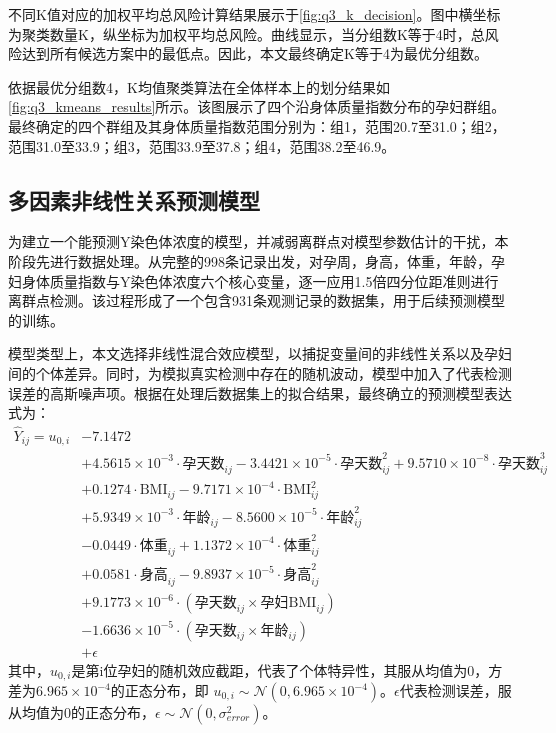 不同K值对应的加权平均总风险计算结果展示于\cref{fig:q3_k_decision}。图中横坐标为聚类数量K，纵坐标为加权平均总风险。曲线显示，当分组数K等于4时，总风险达到所有候选方案中的最低点。因此，本文最终确定K等于4为最优分组数。



依据最优分组数4，K均值聚类算法在全体样本上的划分结果如\cref{fig:q3_kmeans_results}所示。该图展示了四个沿身体质量指数分布的孕妇群组。最终确定的四个群组及其身体质量指数范围分别为：组1，范围20.7至31.0；组2，范围31.0至33.9；组3，范围33.9至37.8；组4，范围38.2至46.9。

\subsection{多因素非线性关系预测模型}
为建立一个能预测Y染色体浓度的模型，并减弱离群点对模型参数估计的干扰，本阶段先进行数据处理。从完整的998条记录出发，对孕周，身高，体重，年龄，孕妇身体质量指数与Y染色体浓度六个核心变量，逐一应用1.5倍四分位距准则进行离群点检测。该过程形成了一个包含931条观测记录的数据集，用于后续预测模型的训练。

模型类型上，本文选择非线性混合效应模型，以捕捉变量间的非线性关系以及孕妇间的个体差异。同时，为模拟真实检测中存在的随机波动，模型中加入了代表检测误差的高斯噪声项。根据在处理后数据集上的拟合结果，最终确立的预测模型表达式为：
\begin{equation}
\begin{aligned}
\hat{Y}_{ij} = u_{0,i} & - 7.1472 \\
& + 4.5615 \times 10^{-3} \cdot \text{孕天数}_{ij} - 3.4421 \times 10^{-5} \cdot \text{孕天数}_{ij}^2 + 9.5710 \times 10^{-8} \cdot \text{孕天数}_{ij}^3 \\
& + 0.1274 \cdot \text{BMI}_{ij} - 9.7171 \times 10^{-4} \cdot \text{BMI}_{ij}^2 \\
& + 5.9349 \times 10^{-3} \cdot \text{年龄}_{ij} - 8.5600 \times 10^{-5} \cdot \text{年龄}_{ij}^2 \\
& - 0.0449 \cdot \text{体重}_{ij} + 1.1372 \times 10^{-4} \cdot \text{体重}_{ij}^2 \\
& + 0.0581 \cdot \text{身高}_{ij} - 9.8937 \times 10^{-5} \cdot \text{身高}_{ij}^2 \\
& + 9.1773 \times 10^{-6} \cdot (\text{孕天数}_{ij} \times \text{孕妇BMI}_{ij}) \\
& - 1.6636 \times 10^{-5} \cdot (\text{孕天数}_{ij} \times \text{年龄}_{ij}) \\
& + \epsilon
\end{aligned}
\end{equation}
其中，$u_{0,i}$是第i位孕妇的随机效应截距，代表了个体特异性，其服从均值为0，方差为$6.965 \times 10^{-4}$的正态分布，即 $u_{0,i} \sim \mathcal{N}(0, 6.965 \times 10^{-4})$。$\epsilon$代表检测误差，服从均值为0的正态分布，$\epsilon \sim \mathcal{N}(0, \sigma^2_{error})$。

